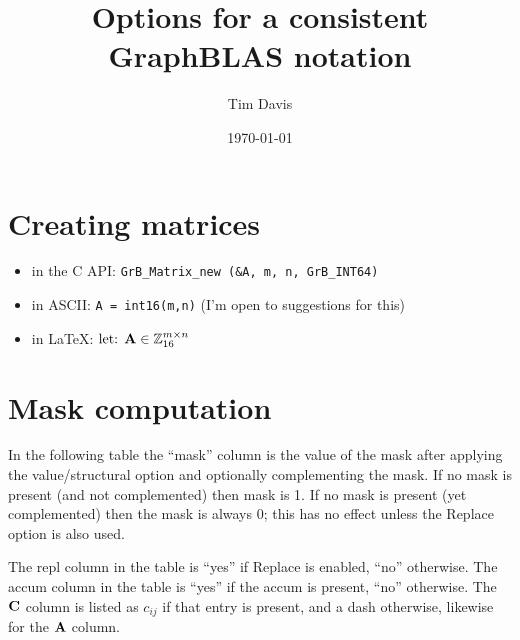 \documentclass[11pt]{article}
\title{Options for a consistent GraphBLAS notation}
\author{Tim Davis}
\date{\today}
\begin{document}
\maketitle

\section{Creating matrices}

\begin{itemize}
\item[] in the C API: \verb'GrB_Matrix_new (&A, m, n, GrB_INT64)'
\item[] in ASCII: \verb'A = int16(m,n)' (I'm open to suggestions for this)
\item[] in LaTeX: $\mbox{let: } {\bf A} \in \mathbb{Z}^{m \times n}_{16}$
\end{itemize}

\section{Mask computation}

In the following table the ``mask'' column is the value of the
mask after applying the value/structural option and optionally
complementing the mask.  If no mask is present (and not complemented)
then mask is 1.  If no mask is present (yet complemented) then the mask is
always 0; this has no effect unless the Replace option is also used.

The repl column in the table is ``yes'' if Replace is enabled, ``no'' otherwise.
The accum column in the table is ``yes'' if the accum is 
present, ``no'' otherwise.
The ${\bf C}$ column is listed as $c_{ij}$ if that entry is present,
and a dash otherwise, likewise for the ${\bf A}$ column.
\end{document}

